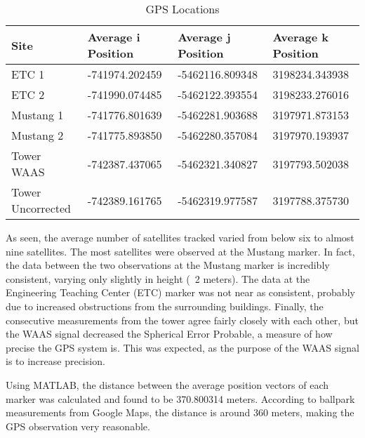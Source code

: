\documentclass[11pt]{article}
\begin{document}
\begin{table}[h]
\centering
\begin{adjustbox}{max width=\textwidth}
\begin{tabular}{l|lll}
Site              & Average i Position & Average j Position & Average k Position \\ \hline
ETC 1             & -741974.202459     & -5462116.809348    & 3198234.343938     \\ \hline
ETC 2             & -741990.074485     & -5462122.393554    & 3198233.276016     \\ \hline
Mustang 1         & -741776.801639     & -5462281.903688    & 3197971.873153     \\ \hline
Mustang 2         & -741775.893850     & -5462280.357084    & 3197970.193937     \\ \hline
Tower WAAS        & -742387.437065     & -5462321.340827    & 3197793.502038     \\ \hline
Tower Uncorrected & -742389.161765     & -5462319.977587    & 3197788.375730    
\end{tabular}               
\end{adjustbox}
\caption{GPS Locations}
\label{tab:vectors}
\end{table}

As seen, the average number of satellites tracked varied from below six to almost nine satellites. The most satellites were observed at the Mustang marker. In fact, the data between the two observations at the Mustang marker is incredibly consistent, varying only slightly in height (~2 meters). The data at the Engineering Teaching Center (ETC) marker was not near as consistent, probably due to increased obstructions from the surrounding buildings. Finally, the consecutive measurements from the tower agree fairly closely with each other, but the WAAS signal decreased the Spherical Error Probable, a measure of how precise the GPS system is. This was expected, as the purpose of the WAAS signal is to increase precision.

Using MATLAB, the distance between the average position vectors of each marker was calculated and found to be 370.800314 meters. According to ballpark measurements from Google Maps, the distance is around 360 meters, making the GPS observation very reasonable.
\end{document}
